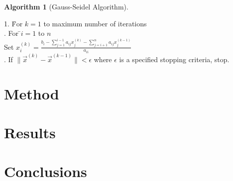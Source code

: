 \documentclass[a4paper,12pt]{report}
\theoremstyle{definition}
\newtheorem{algorithm}{Algorithm}
\begin{document}
\begin{algorithm}[Gauss-Seidel Algorithm]
\hfill\par
\begin{tabbing}
1. \=For $k=1$ to maximum number of iterations\\
. For \=$i=1$ to $n$\\
\>\>Set
\begin{math}
x_i^{(k)} = \frac{b_i-\sum_{j=1}^{i-1}a_{ij}x_j^{(k)}-\sum_{j=i+1}^{n}a_{ij}x_j^{(k-1)}}{a_{ii}}
\end{math}
\\
. If $\|\vec{x}^{(k)}-\vec{x}^{(k-1)}\| < \epsilon$ where $\epsilon$ is a specified stopping criteria, stop.
\end{tabbing}
\end{algorithm}

\chapter{Method}
\label{ch:method}

\chapter{Results}
\label{ch:results}

\chapter{Conclusions}
\label{ch:conc}



\end{document}
